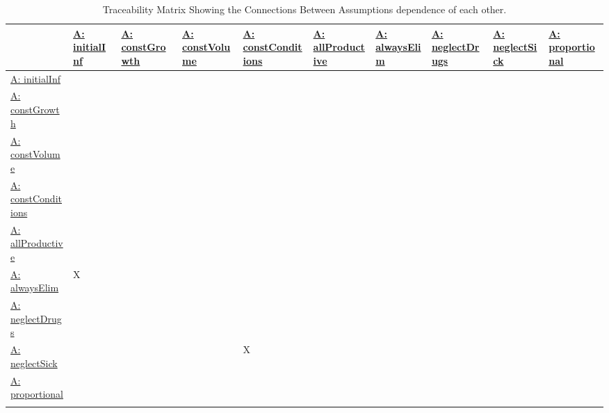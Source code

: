 \documentclass[12pt]{article}
\begin{document}
\begin{longtable}{l l l l l l l l l l}
\toprule
\textbf{} & \textbf{\hyperref[initialInf]{A: initialInf}} & \textbf{\hyperref[constGrowth]{A: constGrowth}} & \textbf{\hyperref[constVolume]{A: constVolume}} & \textbf{\hyperref[constConditions]{A: constConditions}} & \textbf{\hyperref[allProductive]{A: allProductive}} & \textbf{\hyperref[alwaysElim]{A: alwaysElim}} & \textbf{\hyperref[neglectDrugs]{A: neglectDrugs}} & \textbf{\hyperref[neglectSick]{A: neglectSick}} & \textbf{\hyperref[proportional]{A: proportional}}
\\
\midrule
\endhead
\hyperref[initialInf]{A: initialInf} &  &  &  &  &  &  &  &  & 
\\
\hyperref[constGrowth]{A: constGrowth} &  &  &  &  &  &  &  &  & 
\\
\hyperref[constVolume]{A: constVolume} &  &  &  &  &  &  &  &  & 
\\
\hyperref[constConditions]{A: constConditions} &  &  &  &  &  &  &  &  & 
\\
\hyperref[allProductive]{A: allProductive} &  &  &  &  &  &  &  &  & 
\\
\hyperref[alwaysElim]{A: alwaysElim} & X &  &  &  &  &  &  &  & 
\\
\hyperref[neglectDrugs]{A: neglectDrugs} &  &  &  &  &  &  &  &  & 
\\
\hyperref[neglectSick]{A: neglectSick} &  &  &  & X &  &  &  &  & 
\\
\hyperref[proportional]{A: proportional} &  &  &  &  &  &  &  &  & 
\\
\bottomrule
\caption{Traceability Matrix Showing the Connections Between Assumptions dependence of each other.}
\label{Table:TraceMatAvsA}
\end{longtable}
\end{document}
